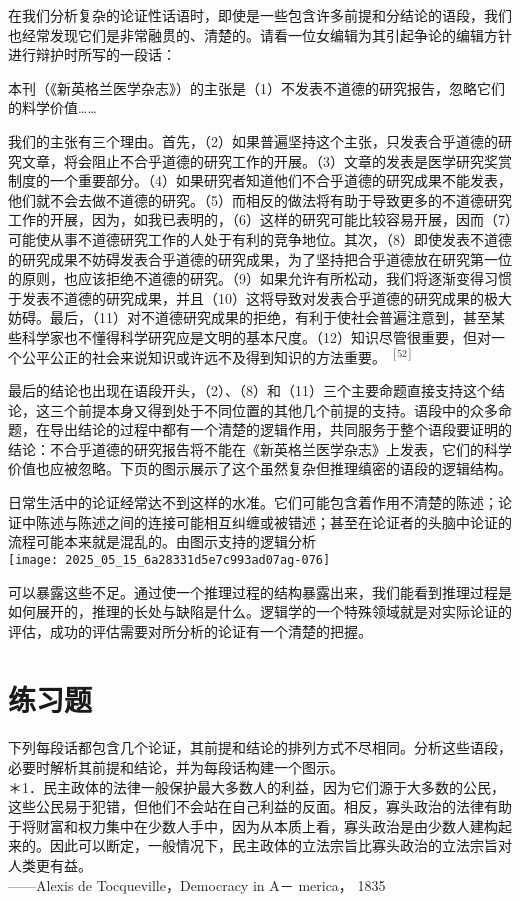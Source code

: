在我们分析复杂的论证性话语时，即使是一些包含许多前提和分结论的语段，我们也经常发现它们是非常融贯的、清楚的。请看一位女编辑为其引起争论的编辑方针进行辩护时所写的一段话：

本刊（《新英格兰医学杂志》）的主张是（1）不发表不道德的研究报告，忽略它们的料学价值……

我们的主张有三个理由。首先，（2）如果普遍坚持这个主张，只发表合乎道德的研究文章，将会阻止不合乎道德的研究工作的开展。（3）文章的发表是医学研究奖赏制度的一个重要部分。（4）如果研究者知道他们不合乎道德的研究成果不能发表，他们就不会去做不道德的研究。（5）而相反的做法将有助于导致更多的不道德研究工作的开展，因为，如我已表明的，（6）这样的研究可能比较容易开展，因而（7）可能使从事不道德研究工作的人处于有利的竞争地位。其次，（8）即使发表不道德的研究成果不妨碍发表合乎道德的研究成果，为了坚持把合乎道德放在研究第一位的原则，也应该拒绝不道德的研究。（9）如果允许有所松动，我们将逐渐变得习惯于发表不道德的研究成果，并且（10）这将导致对发表合乎道德的研究成果的极大妨碍。最后，（11）对不道德研究成果的拒绝，有利于使社会普遍注意到，甚至某些科学家也不懂得科学研究应是文明的基本尺度。（12）知识尽管很重要，但对一个公平公正的社会来说知识或许远不及得到知识的方法重要。 ${ }^{[52]}$

最后的结论也出现在语段开头，（2）、（8）和（11）三个主要命题直接支持这个结论，这三个前提本身又得到处于不同位置的其他几个前提的支持。语段中的众多命题，在导出结论的过程中都有一个清楚的逻辑作用，共同服务于整个语段要证明的结论：不合乎道德的研究报告将不能在《新英格兰医学杂志》上发表，它们的科学价值也应被忽略。下页的图示展示了这个虽然复杂但推理缜密的语段的逻辑结构。

日常生活中的论证经常达不到这样的水准。它们可能包含着作用不清楚的陈述；论证中陈述与陈述之间的连接可能相互纠缠或被错述；甚至在论证者的头脑中论证的流程可能本来就是混乱的。由图示支持的逻辑分析\\
\texttt{[image: 2025\_05\_15\_6a28331d5e7c993ad07ag-076]}

可以暴露这些不足。通过使一个推理过程的结构暴露出来，我们能看到推理过程是如何展开的，推理的长处与缺陷是什么。逻辑学的一个特殊领域就是对实际论证的评估，成功的评估需要对所分析的论证有一个清楚的把握。

\section*{练习题}
下列每段话都包含几个论证，其前提和结论的排列方式不尽相同。分析这些语段，必要时解析其前提和结论，并为每段话构建一个图示。\\
＊1．民主政体的法律一般保护最大多数人的利益，因为它们源于大多数的公民，这些公民易于犯错，但他们不会站在自己利益的反面。相反，寡头政治的法律有助于将财富和权力集中在少数人手中，因为从本质上看，寡头政治是由少数人建构起来的。因此可以断定，一般情况下，民主政体的立法宗旨比寡头政治的立法宗旨对人类更有益。\\
——Alexis de Tocqueville，Democracy in A－ merica， 1835

